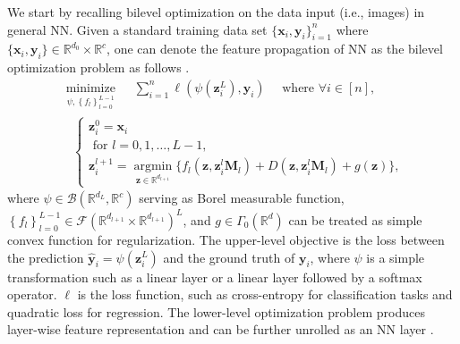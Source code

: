 \documentclass{article}
\begin{document}
We start by recalling bilevel optimization on the data input (i.e., images) in general NN. Given a standard training data set $\{\mathbf x_i, \mathbf y_i\}_{i=1}^n$ where $\{\mathbf x_i, \mathbf y_i\} \in \mathbb{R}^{d_0}\times \mathbb{R}^{c}$, one
can denote the feature propagation of NN as the bilevel optimization problem as follows \cite{frecon2022bregman}.
\begin{equation} \label{nnopt}
\begin{gathered}
\underset{\substack{\psi, \left\{f_l\right\}_{l=0}^{L-1}}}
{\operatorname{minimize}} \quad \sum_{i=1}^n \ell\left(\psi\left(\mathbf z_i^{L}\right), \mathbf y_i\right) 
\quad \text { where } \forall i \in[n],\\
\quad\left\{\begin{array}{l}
\mathbf z_i^{0}=\mathbf x_i \\
\text { for } l=0,1, \ldots, L-1, \\
\mathbf z_i^{l+1}=\underset{\mathbf z \in \mathbb{R}^{d_{l+1}}}{\operatorname{argmin}} \{f_l\left(\mathbf z, \mathbf z_i^{l}\mathbf M_l\right) +D\left(\mathbf z, \mathbf z_i^{l}\mathbf M_l\right)+g(\mathbf z)\},
\end{array}\right.
\end{gathered} 
\end{equation}
where $\psi \in \mathcal{B}\left(\mathbb{R}^{d_{L}}, \mathbb{R}^c\right)$ serving as Borel measurable function, $\left\{f_l\right\}_{l=0}^{L-1} \in \mathcal{F}\left(\mathbb{R}^{d_{l+1}} \times \mathbb{R}^{d_{l+1}}\right)^L$, and $g\in \Gamma_0(\mathbb R^d)$ can be treated as simple convex function for regularization. 
The upper-level objective is the loss between the prediction $\widehat{\mathbf {y}}_i=\psi(\mathbf z_i^{L})$ and the ground truth of $\mathbf y_i$, where $\psi $ is a simple transformation such as a linear layer or a linear layer followed by a softmax operator. $\ell$ is the loss function, such as cross-entropy for classification tasks and quadratic loss for regression. The lower-level optimization problem produces layer-wise feature representation and can be further unrolled as an NN layer \cite{frecon2022bregman}.
\end{document}
